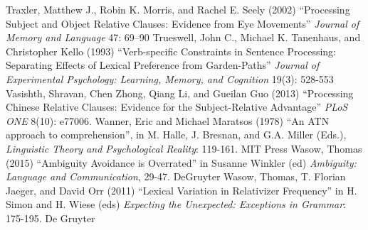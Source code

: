 \documentclass[a4paper]{article}
\begin{document}
\newline
\newline
Traxler, Matthew J., Robin K. Morris, and Rachel E. Seely (2002) ``Processing Subject and Object Relative Clauses: 
Evidence from Eye Movements'' {\it Journal of Memory and Language} 47: 69–90 
\newline
\newline
Trueswell, John C., Michael K. Tanenhaus, and Christopher Kello (1993) ``Verb-specific Constraints in Sentence Processing: Separating Effects of Lexical Preference from Garden-Paths'' {\it Journal of Experimental Psychology: Learning, Memory, and Cognition} 19(3): 528-553
\newline
\newline
Vasishth, Shravan, Chen Zhong, Qiang Li, and Gueilan Guo (2013) ``Processing Chinese Relative Clauses: Evidence for the Subject-Relative Advantage'' {\it PLoS ONE} 8(10): e77006.
\newline    
\newline
Wanner, Eric and Michael Maratsos (1978) ``An ATN approach to comprehension'', in M. Halle, J. Bresnan, and G.A. Miller (Eds.), {\it Linguistic Theory and Psychological Reality}: 119-161. MIT Press
\newline
\newline
Wasow, Thomas  (2015) ``Ambiguity Avoidance is Overrated'' in Susanne Winkler (ed) {\it Ambiguity: Language and Communication}, 29-47. DeGruyter
 \newline
\newline
Wasow, Thomas, T. Florian Jaeger, and David Orr (2011) ``Lexical Variation in Relativizer Frequency'' in H. Simon and H. Wiese (eds) {\it Expecting the Unexpected: Exceptions in Grammar}: 175-195. De Gruyter 
\end{document}
